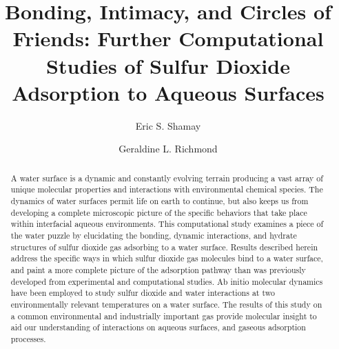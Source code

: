 \documentclass{article}
\title{Bonding, Intimacy, and Circles of Friends: Further Computational Studies of Sulfur Dioxide Adsorption to Aqueous Surfaces}
\author{Eric S. Shamay \and Geraldine L. Richmond}
\begin{document}
\newcommand{\suldiox}{SO$_2$}
\newcommand{\ang}{\,$\textrm{\AA}$}
\newcommand{\angs}{\ang}
\newcommand{\wat}{H$_2$O}

\maketitle

\doublespacing


\begin{abstract}
A water surface is a dynamic and constantly evolving terrain producing a vast array of unique molecular properties and interactions with environmental chemical species. The dynamics of water surfaces permit life on earth to continue, but also keeps us from developing a complete microscopic picture of the specific behaviors that take place within interfacial aqueous environments. This computational study examines a piece of the water puzzle by elucidating the bonding, dynamic interactions, and hydrate structures of sulfur dioxide gas adsorbing to a water surface. Results described herein address the specific ways in which sulfur dioxide gas molecules bind to a water surface, and paint a more complete picture of the adsorption pathway than was previously developed from experimental and computational studies. Ab initio molecular dynamics have been employed to study sulfur dioxide and water interactions at two environmentally relevant temperatures on a water surface. The results of this study on a common environmental and industrially important gas provide molecular insight to aid our understanding of interactions on aqueous surfaces, and gaseous adsorption processes.
\end{abstract}









\end{document}
